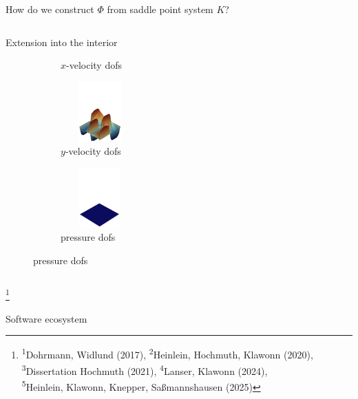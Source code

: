 \begin{frame}{How do we construct $\varPhi$ from saddle point system $K$?}
\begin{columns}
\begin{column}{0.52\textwidth}
{\begin{block}{\normalsize Extension into the interior}
\begin{figure}
\begin{subfigure}{0.29\textwidth}
							\vspace*{-5mm}
							\caption{$x$-velocity dofs}
						\end{subfigure}
						\vfill
						\hspace*{-12mm}
						\begin{subfigure}{0.29\textwidth}
							\centering
                            \vspace*{-3mm}
							\includegraphics[width=3cm,height=23mm]{images/RGDSW-y-cut.png}
							\vspace*{-5mm}
							\caption{$y$-velocity dofs}
						\end{subfigure}
						\hspace{12mm}
						\begin{subfigure}{0.29\textwidth}
							\centering
                            \vspace*{-3mm}
							\includegraphics[width=3cm,height=23mm]{images/RGDSW-p-cut-zero.png}
							\vspace*{-5mm}
							\caption{pressure dofs}
						\end{subfigure}
					\end{figure}
					\vspace{-4mm}
				\end{block}
			}
		\end{column}
	\end{columns}
	{\let\thefootnote\relax\footnote{{\tiny \!\!\!\!\textsuperscript{1}Dohrmann, Widlund (2017), \textsuperscript{2}Heinlein, Hochmuth, Klawonn (2020),  \textsuperscript{3}Dissertation Hochmuth (2021),  \textsuperscript{4}Lanser, Klawonn (2024),\\\hspace{3em}\!\!\!\!\!\!\textsuperscript{5}Heinlein, Klawonn, Knepper, Saßmannshausen (2025)}}}
\end{frame}
\setcounter{footnote}{5}
\begin{frame}{Software ecosystem}
	
\end{frame}


